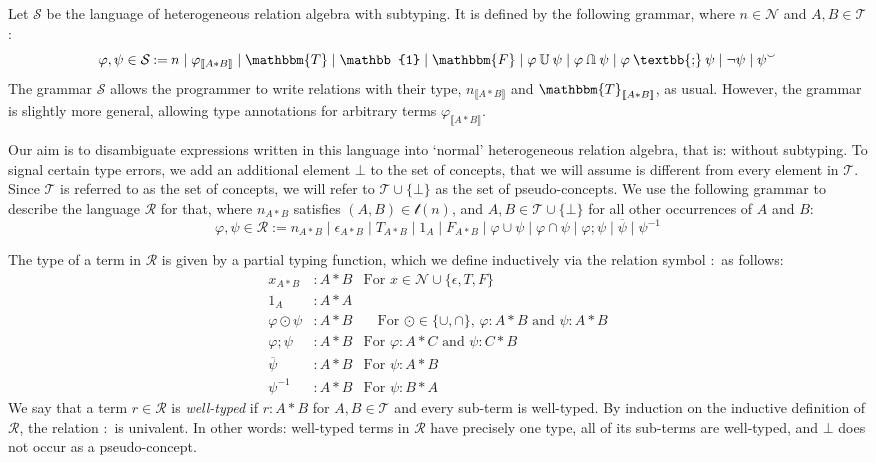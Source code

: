 \documentclass[12pt]{article}
\newcommand{\typesemi}{\mathbin{\text{\textbb{;}}}}
\newcommand{\typeunion}{\mathbin{\mathbb{U}}}
\newcommand{\typeinter}{\mathbin{\text{\rotatebox[origin=c]{180}{$\typeunion$}}}}
\newcommand{\typevee}{\mathbbm{T}}
\newcommand{\typenil}{\mathbbm{F}}
\newcommand{\typecomp}[1]{\neg{#1}}
\newcommand{\typeconv}[1]{{#1}^\smallsmile}
\newcommand{\typeident}{\mathbb{1}}
\newcommand{\typetyped}[2]{{#1}_{\llbracket #2 \rrbracket}}
\newcommand{\conv}[1]{{#1}^{-1}}
\begin{document}
Let $\mathcal{S}$ be the language of heterogeneous relation algebra with subtyping.
It is defined by the following grammar, where $n\in\mathcal{N}$ and $A,B\in\mathcal{T}$:
\[
\varphi,\psi\in\mathcal{S} \mathbin{:=} n \mid \typetyped{\varphi}{A*B} \mid \typevee \mid \typeident \mid \typenil \mid \varphi \typeunion \psi \mid \varphi \typeinter \psi \mid \varphi \typesemi \psi \mid \typecomp{\psi}\mid \typeconv{\psi}
\]
The grammar $\mathcal{S}$ allows the programmer to write relations with their type, $\typetyped{n}{A*B}$ and $\typetyped{\typevee}{A*B}$, as usual.
However, the grammar is slightly more general, allowing type annotations for arbitrary terms $\typetyped{\varphi}{A*B}$.

Our aim is to disambiguate expressions written in this language into `normal' heterogeneous relation algebra, that is: without subtyping.
To signal certain type errors, we add an additional element $\bot$ to the set of concepts, that we will assume is different from every element in $\mathcal{T}$.
Since $\mathcal{T}$ is referred to as the set of concepts, we will refer to $\mathcal{T}\cup\{\bot\}$ as the set of pseudo-concepts.
We use the following grammar to describe the language $\mathcal{R}$ for that, where $n_{A*B}$ satisfies $(A,B)\in \mathcal{t}(n)$, and $A,B\in\mathcal{T}\cup\{\bot\}$ for all other occurrences of $A$ and $B$:
\[
\varphi,\psi\in\mathcal{R} \mathbin{:=} n_{A*B} \mid \epsilon_{A*B} \mid T_{A*B} \mid 1_{A} \mid F_{A*B} \mid \varphi \cup \psi \mid \varphi \cap \psi \mid \varphi ; \psi \mid \overline{\psi}\mid \conv{\psi}
\]

The type of a term in $\mathcal{R}$ is given by a partial typing function, which we define inductively via the relation symbol $:$ as follows:
\begin{align*}
x_{A*B} &: A * B & \text{For $x \in \mathcal{N} \cup \{\epsilon, T, F\}$}\\
1_{A} &: A * A&\\
\varphi \odot \psi &: A * B &\quad\text{For $\odot \in \{\cup,\cap\}$, $\varphi : A * B$ and $\psi : A * B$}\\
\varphi ; \psi &: A * B &\text{For $\varphi : A * C$ and $\psi : C * B$}\\
\overline{\psi} &: A * B &\text{For $\psi : A * B$}\\
\conv{\psi} &: A * B &\text{For $\psi : B * A$}
\end{align*}
We say that a term $r\in \mathcal{R}$ is \emph{well-typed} if $r : A*B$ for $A,B\in \mathcal{T}$ and every sub-term is well-typed.
By induction on the inductive definition of $\mathcal{R}$, the relation $:$ is univalent.
In other words: well-typed terms in $\mathcal{R}$ have precisely one type, all of its sub-terms are well-typed, and $\bot$ does not occur as a pseudo-concept.
\end{document}
